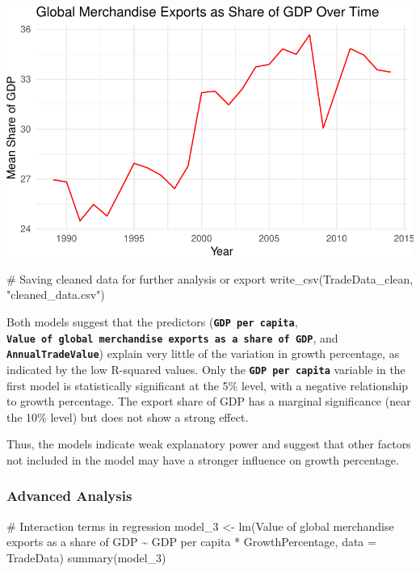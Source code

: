 \documentclass[
  10pt,
]{article}
\newenvironment{Shaded}{\begin{snugshade}}{\end{snugshade}}
\newcommand{\AttributeTok}[1]{\textcolor[rgb]{0.40,0.45,0.13}{#1}}
\newcommand{\CommentTok}[1]{\textcolor[rgb]{0.37,0.37,0.37}{#1}}
\newcommand{\FunctionTok}[1]{\textcolor[rgb]{0.28,0.35,0.67}{#1}}
\newcommand{\NormalTok}[1]{\textcolor[rgb]{0.00,0.23,0.31}{#1}}
\newcommand{\OtherTok}[1]{\textcolor[rgb]{0.00,0.23,0.31}{#1}}
\newcommand{\SpecialCharTok}[1]{\textcolor[rgb]{0.37,0.37,0.37}{#1}}
\newcommand{\StringTok}[1]{\textcolor[rgb]{0.13,0.47,0.30}{#1}}
\begin{document}
\includegraphics{draft_1_files/figure-pdf/unnamed-chunk-21-2.pdf}

\begin{Shaded}
\begin{Highlighting}[]
\CommentTok{\# Saving cleaned data for further analysis or export}
\FunctionTok{write\_csv}\NormalTok{(TradeData\_clean, }\StringTok{"cleaned\_data.csv"}\NormalTok{)}
\end{Highlighting}
\end{Shaded}

Both models suggest that the predictors
(\textbf{\texttt{GDP\ per\ capita}},
\textbf{\texttt{Value\ of\ global\ merchandise\ exports\ as\ a\ share\ of\ GDP}},
and \textbf{\texttt{AnnualTradeValue}}) explain very little of the
variation in growth percentage, as indicated by the low R-squared
values. Only the \textbf{\texttt{GDP\ per\ capita}} variable in the
first model is statistically significant at the 5\% level, with a
negative relationship to growth percentage. The export share of GDP has
a marginal significance (near the 10\% level) but does not show a strong
effect.

Thus, the models indicate weak explanatory power and suggest that other
factors not included in the model may have a stronger influence on
growth percentage.

\subsubsection{Advanced Analysis}\label{advanced-analysis}

\begin{Shaded}
\begin{Highlighting}[]
\CommentTok{\# Interaction terms in regression}
\NormalTok{model\_3 }\OtherTok{\textless{}{-}} \FunctionTok{lm}\NormalTok{(}\StringTok{\textasciigrave{}}\AttributeTok{Value of global merchandise exports as a share of GDP}\StringTok{\textasciigrave{}} \SpecialCharTok{\textasciitilde{}} 
              \StringTok{\textasciigrave{}}\AttributeTok{GDP per capita}\StringTok{\textasciigrave{}} \SpecialCharTok{*}\NormalTok{ GrowthPercentage, }\AttributeTok{data =}\NormalTok{ TradeData)}
\FunctionTok{summary}\NormalTok{(model\_3)}
\end{Highlighting}
\end{Shaded}
\end{document}
